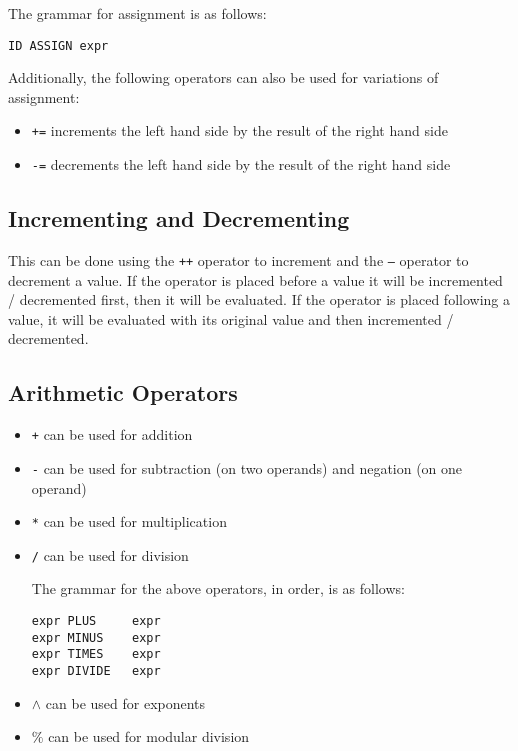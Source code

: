\documentclass{article}
\begin{document}
The grammar for assignment is as follows:
\begin{Verbatim}[frame=single]
ID ASSIGN expr
\end{Verbatim}

Additionally, the following operators can also be used for variations of assignment:

\begin{itemize}
\item \texttt{+=} increments the left hand side by the result of the right hand side
\item \texttt{-=} decrements the left hand side by the result of the right hand side
\end{itemize}

\subsection{Incrementing and Decrementing}
This can be done using the \texttt{++} operator to increment and the \texttt{--} operator to decrement a value.  If the operator is placed before a value it will be incremented / decremented first, then it will be evaluated.  If the operator is placed following a value, it will be evaluated with its original value and then incremented / decremented.

\subsection{Arithmetic Operators}
\begin{itemize}
\item \texttt{+} can be used for addition
\item \texttt{-} can be used for subtraction (on two operands) and negation (on one operand)
\item \texttt{*} can be used for multiplication
\item \texttt{/} can be used for division

The grammar for the above operators, in order, is as follows:
\begin{Verbatim}[frame=single]
expr PLUS     expr
expr MINUS    expr
expr TIMES    expr
expr DIVIDE   expr
\end{Verbatim}
\item \texttt{$\wedge$} can be used for exponents
\item \texttt{$\%$} can be used for modular division
\end{itemize}
\end{document}
